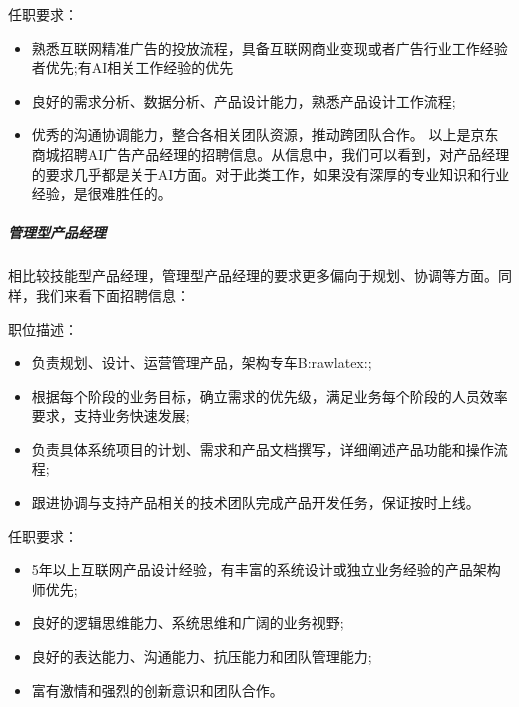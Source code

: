 \documentclass[letterpaper,11pt,english]{sphinxmanual}
\begin{document}
任职要求：
\begin{itemize}
\item {} 
熟悉互联网精准广告的投放流程，具备互联网商业变现或者广告行业工作经验者优先;有AI相关工作经验的优先

\item {} 
良好的需求分析、数据分析、产品设计能力，熟悉产品设计工作流程;

\item {} 
优秀的沟通协调能力，整合各相关团队资源，推动跨团队合作。
以上是京东商城招聘AI广告产品经理的招聘信息。从信息中，我们可以看到，对产品经理的要求几乎都是关于AI方面。对于此类工作，如果没有深厚的专业知识和行业经验，是很难胜任的。

\end{itemize}


\subparagraph{管理型产品经理}
\label{\detokenize{chapter_introduction/PM:id16}}
相比较技能型产品经理，管理型产品经理的要求更多偏向于规划、协调等方面。同样，我们来看下面招聘信息：

职位描述：
\begin{itemize}
\item {} 
负责规划、设计、运营管理产品，架构专车B:raw\sphinxhyphen{}latex:;

\item {} 
根据每个阶段的业务目标，确立需求的优先级，满足业务每个阶段的人员效率要求，支持业务快速发展;

\item {} 
负责具体系统项目的计划、需求和产品文档撰写，详细阐述产品功能和操作流程;

\item {} 
跟进协调与支持产品相关的技术团队完成产品开发任务，保证按时上线。

\end{itemize}

任职要求：
\begin{itemize}
\item {} 
5年以上互联网产品设计经验，有丰富的系统设计或独立业务经验的产品架构师优先;

\item {} 
良好的逻辑思维能力、系统思维和广阔的业务视野;

\item {} 
良好的表达能力、沟通能力、抗压能力和团队管理能力;

\item {} 
富有激情和强烈的创新意识和团队合作。

\end{itemize}
\end{document}
